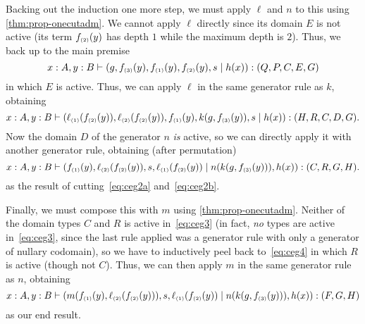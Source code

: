 \begin{props}
Backing out the induction one more step, we must apply $\ell$ and $n$ to this using \cref{thm:prop-onecutadm}.
We cannot apply $\ell$ directly since its domain $E$ is not active (its term $f_{\scriptscriptstyle(2)}(y)$ has depth $1$ while the maximum depth is $2$).
Thus, we back up to the main premise
\[ x:A,y:B \vdash (g,f_{\scriptscriptstyle(3)}(y),f_{\scriptscriptstyle(1)}(y),f_{\scriptscriptstyle(2)}(y),s \mid h(x)) : (Q,P,C,E,G) \]
in which $E$ is active.
Thus, we can apply $\ell$ in the same generator rule as $k$, obtaining
\begin{equation}
  x:A,y:B \types (\ell\s1(f\s2(y)),\ell\s2(f\s2(y)),f\s1(y),k(g,f\s3(y)),s \mid h(x)) : (H,R,C,D,G).\label{eq:ceg4}
\end{equation}
Now the domain $D$ of the generator $n$ \emph{is} active, so we can directly apply it with another generator rule, obtaining (after permutation)
\begin{equation}
  x:A,y:B \types (f\s1(y),\ell\s2(f\s2(y)),s,\ell\s1(f\s2(y)) \mid n(k(g,f\s3(y))),h(x)) : (C,R,G,H).\label{eq:ceg3}
\end{equation}
as the result of cutting~\eqref{eq:ceg2a} and~\eqref{eq:ceg2b}.

Finally, we must compose this with $m$ using \cref{thm:prop-onecutadm}.
Neither of the domain types $C$ and $R$ is active in~\eqref{eq:ceg3} (in fact, \emph{no} types are active in~\eqref{eq:ceg3}, since the last rule applied was a generator rule with only a generator of nullary codomain), so we have to inductively peel back to~\eqref{eq:ceg4} in which $R$ is active (though not $C$).
Thus, we can then apply $m$ in the same generator rule as $n$, obtaining
\begin{equation}
  x:A,y:B \types (m(f\s1(y),\ell\s2(f\s2(y))),s,\ell\s1(f\s2(y)) \mid n(k(g,f\s3(y))),h(x)) : (F,G,H)\label{eq:ceg}
\end{equation}
as our end result.


\end{props}

